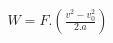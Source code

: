 \documentclass[preview]{standalone}
\begin{document}
\begin{align*}
W = F . \left(\frac{v^2 - v^{2}_0}{2.a}\right)
\end{align*}
\end{document}
